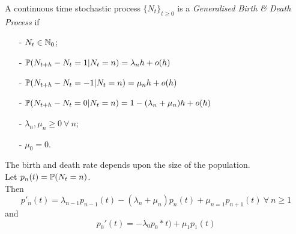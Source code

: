 \documentclass[11pt,a4paper]{article}
\begin{document}
A continuous time stochastic process $\{N_t\}_{t\geq 0}$ is a \textit{Generalised Birth \& Death Process} if
\begin{itemize}
	\item[-] $N_t\in\mathbb{N}_0$;
	\item[-] $\mathbb{P}(N_{t+h}-N_t=1|N_t=n)=\lambda_nh+o(h)$
	\item[-] $\mathbb{P}(N_{t+h}-N_t=-1|N_t=n)=\mu_nh+o(h)$
	\item[-] $\mathbb{P}(N_{t+h}-N_t=0|N_t=n)=1-(\lambda_n+\mu_n)h+o(h)$
	\item[-] $\lambda_n,\mu_n\geq0\ \forall\ n$;
	\item[-] $\mu_0=0$.
\end{itemize}
\nb The birth and death rate depends upon the size of the population.\\

Let $p_n(t)=\mathbb{P}(N_t=n)$.\\
Then
$$p'_n(t)=\lambda_{n-1}p_{n-1}(t)-(\lambda_n+\mu_n)p_n(t)+\mu_{n=1}p_{n+1}(t)\ \forall\ n\geq 1$$
and
$$p_0'(t)=-\lambda_0p_0*t)+\mu_1p_1(t)$$
\end{document}
